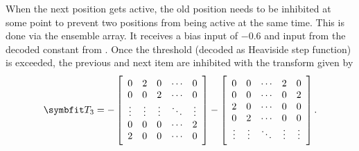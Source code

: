 When the next position gets active, the old position needs to be inhibited at some point to prevent two positions from being active at the same time.
This is done via the  ensemble array.
It receives a bias input of \num{-0.6} and input from the decoded constant from .
Once the threshold (decoded as Heaviside step function) is exceeded, the previous and next item are inhibited with the transform given by
\begin{equation}
    \mat T_3 = -\sbr{\begin{array}{ccccc}
            0 & 2 & 0 & \cdots & 0 \\
            0 & 0 & 2 & \cdots & 0 \\
            \vdots & \vdots & \vdots & \ddots & \vdots \\
            0 & 0 & 0 & \cdots & 2 \\
            2 & 0 & 0 & \cdots & 0
    \end{array}} - \sbr{\begin{array}{ccccc}
        0 & 0 & \cdots & 2 & 0 \\
        0 & 0 & \cdots & 0 & 2 \\
        2 & 0 & \cdots & 0 & 0 \\
        0 & 2 & \cdots & 0 & 0 \\
        \vdots & \vdots & \ddots & \vdots & \vdots
    \end{array}} \text{.}
\end{equation}
